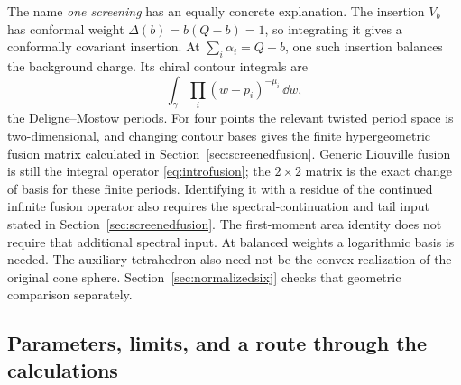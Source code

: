 The name \emph{one screening} has an equally concrete explanation.
The insertion $V_b$ has conformal weight
$\Delta(b)=b(Q-b)=1$, so integrating it gives a conformally
covariant insertion. At $\sum_i\alpha_i=Q-b$, one such insertion
balances the background charge. Its chiral contour integrals are
\[
 \int_\gamma\prod_i(w-p_i)^{-\mu_i}\,\dd w,
\]
the Deligne--Mostow periods. For four points the relevant twisted
period space is two-dimensional, and changing contour bases gives
the finite hypergeometric fusion matrix calculated in
Section~\ref{sec:screenedfusion}. Generic Liouville fusion is still
the integral operator \eqref{eq:introfusion}; the $2\times2$ matrix
is the exact change of basis for these finite periods. Identifying
it with a residue of the continued infinite fusion operator also
requires the spectral-continuation and tail input stated in
Section~\ref{sec:screenedfusion}. The first-moment area identity
does not require that additional spectral input. At balanced
weights a logarithmic basis is needed. The auxiliary tetrahedron
also need not be the convex realization of the original cone
sphere. Section~\ref{sec:normalizedsixj} checks that geometric
comparison separately.

\subsection{Parameters, limits, and a route through the calculations}
\label{sec:introreadingguide}

